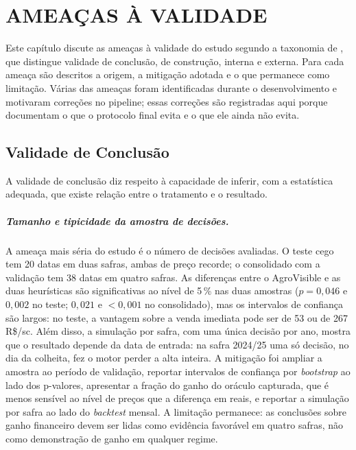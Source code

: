 \chapter{\MakeUppercase{Ameaças à Validade}}\label{sec:ameacas}

Este capítulo discute as ameaças à validade do estudo segundo a taxonomia de , que distingue validade de conclusão, de construção, interna e externa. Para cada ameaça são descritos a origem, a mitigação adotada e o que permanece como limitação. Várias das ameaças foram identificadas durante o desenvolvimento e motivaram correções no pipeline; essas correções são registradas aqui porque documentam o que o protocolo final evita e o que ele ainda não evita.

\section{Validade de Conclusão}\label{sec2:amc-conclusao}

A validade de conclusão diz respeito à capacidade de inferir, com a estatística adequada, que existe relação entre o tratamento e o resultado.

\paragraph{Tamanho e tipicidade da amostra de decisões.} A ameaça mais séria do estudo é o número de decisões avaliadas. O teste cego tem 20 datas em duas safras, ambas de preço recorde; o consolidado com a validação tem 38 datas em quatro safras. As diferenças entre o AgroVisible e as duas heurísticas são significativas ao nível de 5\,\% nas duas amostras ($p = 0{,}046$ e $0{,}002$ no teste; $0{,}021$ e $< 0{,}001$ no consolidado), mas os intervalos de confiança são largos: no teste, a vantagem sobre a venda imediata pode ser de 53 ou de 267 R\$/sc. Além disso, a simulação por safra, com uma única decisão por ano, mostra que o resultado depende da data de entrada: na safra 2024/25 uma só decisão, no dia da colheita, fez o motor perder a alta inteira. A mitigação foi ampliar a amostra ao período de validação, reportar intervalos de confiança por \textit{bootstrap} ao lado dos p-valores, apresentar a fração do ganho do oráculo capturada, que é menos sensível ao nível de preços que a diferença em reais, e reportar a simulação por safra ao lado do \textit{backtest} mensal. A limitação permanece: as conclusões sobre ganho financeiro devem ser lidas como evidência favorável em quatro safras, não como demonstração de ganho em qualquer regime.

